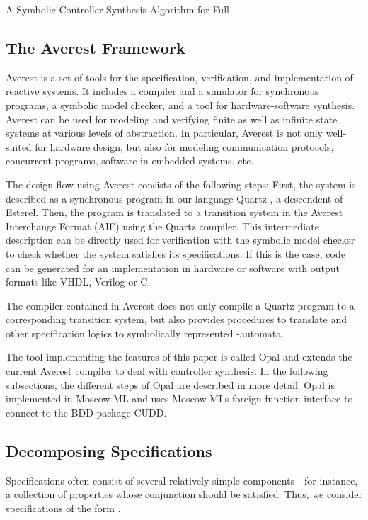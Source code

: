 \documentclass[copyright,creativecommons]{eptcs}
\begin{document}
\begin{section}{A Symbolic Controller Synthesis Algorithm for Full }
\label{SymbolicControllerSynthesis}

\subsection{The Averest Framework}

Averest \cite{Schn09} is a set of tools for the specification, verification, and implementation of reactive systems. It includes a compiler and a simulator for synchronous programs, a symbolic model checker, and a tool for hardware-software synthesis. Averest can be used for modeling and verifying finite as well as infinite state systems at various levels of abstraction. In particular, Averest is not only well-suited for hardware design, but also for modeling communication protocols, concurrent programs, software in embedded systems, etc.

The design flow using Averest consists of the following steps: First, the system is described as a synchronous program in our language Quartz \cite{Schn09}, a descendent of Esterel. Then, the program is translated to a transition system in the Averest Interchange Format (AIF) using the Quartz compiler. This intermediate description can be directly used for verification with the symbolic model checker to check whether the system satisfies its specifications. If this is the case, code can be generated for an implementation in hardware or software with output formats like VHDL, Verilog or C.

The compiler contained in Averest does not only compile a Quartz program to a corresponding transition system, but also provides procedures to translate  and other specification logics to symbolically represented -automata.

The tool implementing the features of this paper is called Opal and extends the current Averest compiler to deal with controller synthesis. In the following subsections, the different steps of Opal are described in more detail. Opal is implemented in Moscow ML and uses Moscow MLs foreign function interface to connect to the BDD-package CUDD.


\subsection{Decomposing Specifications}

Specifications often consist of several relatively simple components - for instance, a collection of  properties whose conjunction should be satisfied. Thus, we consider specifications of the form .


\end{section}
\end{document}
